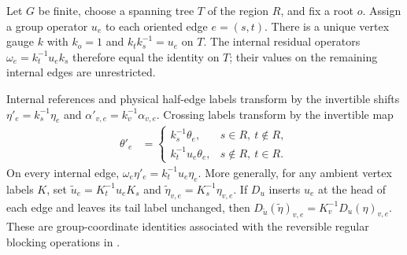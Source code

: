 \begin{lemma}%
    \label{thm:peps_regular_region_tree_gauge}
    \leanok
    Let $G$ be finite, choose a spanning tree $T$ of the region $R$,
    and fix a root $o$. Assign a group operator $u_e$ to each oriented
    edge $e=(s,t)$. There is a unique vertex gauge $k$ with $k_o=1$
    and $k_tk_s^{-1}=u_e$ on $T$. The internal residual operators
    $\omega_e=k_t^{-1}u_ek_s$ therefore equal the identity on $T$;
    their values on the remaining internal edges are unrestricted.

    Internal references and physical half-edge labels transform by the invertible
    shifts $\eta'_e=k_s^{-1}\eta_e$ and
    $\alpha'_{v,e}=k_v^{-1}\alpha_{v,e}$. Crossing labels transform by the
    invertible map
    \begin{align}
        \theta'_e & =
        \begin{cases}
            k_s^{-1}\theta_e,    & s\in R,\ t\notin R, \\
            k_t^{-1}u_e\theta_e, & s\notin R,\ t\in R.
        \end{cases}
        \label{eq:peps_tree_boundary_transport}
    \end{align}
    On every internal edge,
    $\omega_e\eta'_e=k_t^{-1}u_e\eta_e$.
    More generally, for any ambient vertex labels $K$, set
    $\widetilde u_e=K_t^{-1}u_eK_s$ and
    $\widetilde\eta_{v,e}=K_s^{-1}\eta_{v,e}$.
    If $D_u$ inserts $u_e$ at the head of each edge and leaves its
    tail label unchanged, then
    $D_{\widetilde u}(\widetilde\eta)_{v,e}
        =K_v^{-1}D_u(\eta)_{v,e}$.
    These are group-coordinate identities associated with the reversible
    regular blocking operations in \cite[\S6.2--6.3]{Schuch2010PEPS}.
\end{lemma}
